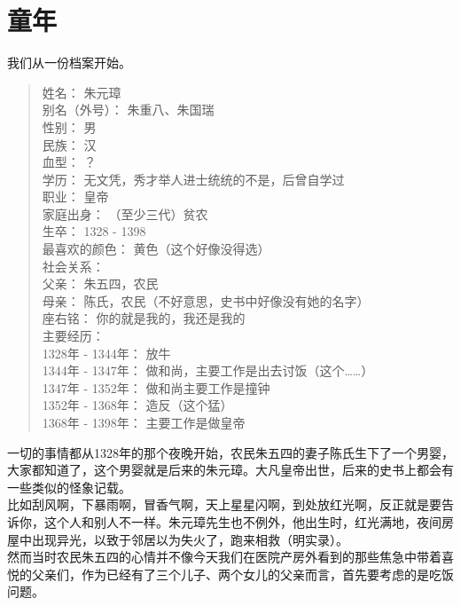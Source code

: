 \section{童年}
\ifnum{}
	\begin{multicols}{\theparacolNo}
\fi
我们从一份档案开始。\\

{\footnotesize \begin{quote}
	姓名： 朱元璋\\
	别名（外号）： 朱重八、朱国瑞\\
	性别： 男\\
	民族： 汉\\
	血型： ？\\
	学历： 无文凭，秀才举人进士统统的不是，后曾自学过\\
	职业： 皇帝\\
	家庭出身： （至少三代）贫农\\
	生卒： 1328 - 1398\\
	最喜欢的颜色： 黄色（这个好像没得选）\\
	
	社会关系：\\
	父亲： 朱五四，农民\\
	母亲： 陈氏，农民（不好意思，史书中好像没有她的名字）\\
	座右铭： 你的就是我的，我还是我的\\
	
	主要经历：\\
	1328年 - 1344年： 放牛\\
	1344年 - 1347年： 做和尚，主要工作是出去讨饭（这个……）\\
	1347年 - 1352年： 做和尚主要工作是撞钟\\
	1352年 - 1368年： 造反（这个猛）\\
	1368年 - 1398年： 主要工作是做皇帝\\
\end{quote}}

一切的事情都从1328年的那个夜晚开始，农民朱五四的妻子陈氏生下了一个男婴，大家都知道了，这个男婴就是后来的朱元璋。大凡皇帝出世，后来的史书上都会有一些类似的怪象记载。\\

比如刮风啊，下暴雨啊，冒香气啊，天上星星闪啊，到处放红光啊，反正就是要告诉你，这个人和别人不一样。朱元璋先生也不例外，他出生时，红光满地，夜间房屋中出现异光，以致于邻居以为失火了，跑来相救（明实录）。\\

然而当时农民朱五四的心情并不像今天我们在医院产房外看到的那些焦急中带着喜悦的父亲们，作为已经有了三个儿子、两个女儿的父亲而言，首先要考虑的是吃饭问题。\\


\end{multicols}
